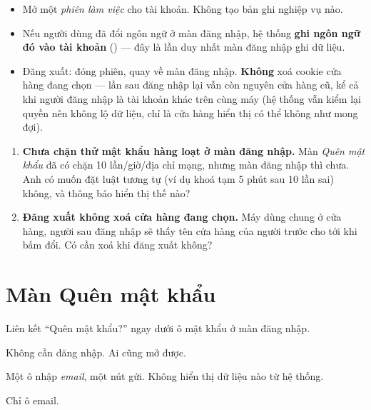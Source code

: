 \mghi

\begin{itemize}[leftmargin=*]
  \item Mở một \emph{phiên làm việc} cho tài khoản. Không tạo bản ghi nghiệp vụ nào.
  \item Nếu người dùng đã đổi ngôn ngữ ở màn đăng nhập, hệ thống \textbf{ghi ngôn ngữ đó vào
        tài khoản} () --- đây là lần duy nhất màn đăng nhập ghi dữ liệu.
  \item Đăng xuất: đóng phiên, quay về màn đăng nhập. \textbf{Không} xoá cookie cửa hàng đang
        chọn --- lần sau đăng nhập lại vẫn còn nguyên cửa hàng cũ, kể cả khi người đăng nhập
        là tài khoản khác trên cùng máy (hệ thống vẫn kiểm lại quyền nên không lộ dữ liệu, chỉ
        là cửa hàng hiển thị có thể không như mong đợi).
\end{itemize}

\mhoi

\begin{ask}
\begin{enumerate}[leftmargin=*]
  \item \textbf{Chưa chặn thử mật khẩu hàng loạt ở màn đăng nhập.} Màn \emph{Quên mật khẩu} đã
        có chặn 10 lần/giờ/địa chỉ mạng, nhưng màn đăng nhập thì chưa. Anh có muốn đặt luật
        tương tự (ví dụ khoá tạm 5 phút sau 10 lần sai) không, và thông báo hiển thị thế nào?
  \item \textbf{Đăng xuất không xoá cửa hàng đang chọn.} Máy dùng chung ở cửa hàng, người sau
        đăng nhập sẽ thấy tên cửa hàng của người trước cho tới khi bấm đổi. Có cần xoá khi
        đăng xuất không?
\end{enumerate}
\end{ask}

\section{Màn Quên mật khẩu}
\medskip

\mvao

Liên kết ``Quên mật khẩu?'' ngay dưới ô mật khẩu ở màn đăng nhập.

\mai

Không cần đăng nhập. Ai cũng mở được.

\mhien

Một ô nhập \emph{email}, một nút gửi. Không hiển thị dữ liệu nào từ hệ thống.

\mloc

Chỉ ô email.

